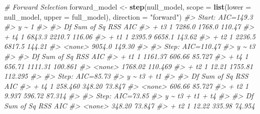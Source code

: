 \documentclass[
]{article}
\newenvironment{Shaded}{\begin{snugshade}}{\end{snugshade}}
\newcommand{\AttributeTok}[1]{\textcolor[rgb]{0.13,0.29,0.53}{#1}}
\newcommand{\CommentTok}[1]{\textcolor[rgb]{0.56,0.35,0.01}{\textit{#1}}}
\newcommand{\FunctionTok}[1]{\textcolor[rgb]{0.13,0.29,0.53}{\textbf{#1}}}
\newcommand{\NormalTok}[1]{#1}
\newcommand{\OtherTok}[1]{\textcolor[rgb]{0.56,0.35,0.01}{#1}}
\newcommand{\StringTok}[1]{\textcolor[rgb]{0.31,0.60,0.02}{#1}}
\begin{document}
\begin{Shaded}
\begin{Highlighting}[]
\CommentTok{\# Forward Selection}
\NormalTok{forward\_model }\OtherTok{\textless{}{-}} \FunctionTok{step}\NormalTok{(null\_model, }\AttributeTok{scope =} \FunctionTok{list}\NormalTok{(}\AttributeTok{lower =}\NormalTok{ null\_model, }\AttributeTok{upper =}\NormalTok{ full\_model), }\AttributeTok{direction =} \StringTok{"forward"}\NormalTok{)}
\CommentTok{\#\textgreater{} Start:  AIC=149.3}
\CommentTok{\#\textgreater{} y \textasciitilde{} 1}
\CommentTok{\#\textgreater{} }
\CommentTok{\#\textgreater{}        Df Sum of Sq    RSS    AIC}
\CommentTok{\#\textgreater{} + t3    1    7286.0 1768.0 110.47}
\CommentTok{\#\textgreater{} + t4    1    6843.3 2210.7 116.06}
\CommentTok{\#\textgreater{} + t1    1    2395.9 6658.1 143.62}
\CommentTok{\#\textgreater{} + t2    1    2236.5 6817.5 144.21}
\CommentTok{\#\textgreater{} \textless{}none\textgreater{}              9054.0 149.30}
\CommentTok{\#\textgreater{} }
\CommentTok{\#\textgreater{} Step:  AIC=110.47}
\CommentTok{\#\textgreater{} y \textasciitilde{} t3}
\CommentTok{\#\textgreater{} }
\CommentTok{\#\textgreater{}        Df Sum of Sq     RSS     AIC}
\CommentTok{\#\textgreater{} + t1    1   1161.37  606.66  85.727}
\CommentTok{\#\textgreater{} + t4    1    656.71 1111.31 100.861}
\CommentTok{\#\textgreater{} \textless{}none\textgreater{}              1768.02 110.469}
\CommentTok{\#\textgreater{} + t2    1     12.21 1755.81 112.295}
\CommentTok{\#\textgreater{} }
\CommentTok{\#\textgreater{} Step:  AIC=85.73}
\CommentTok{\#\textgreater{} y \textasciitilde{} t3 + t1}
\CommentTok{\#\textgreater{} }
\CommentTok{\#\textgreater{}        Df Sum of Sq    RSS    AIC}
\CommentTok{\#\textgreater{} + t4    1   258.460 348.20 73.847}
\CommentTok{\#\textgreater{} \textless{}none\textgreater{}              606.66 85.727}
\CommentTok{\#\textgreater{} + t2    1     9.937 596.72 87.314}
\CommentTok{\#\textgreater{} }
\CommentTok{\#\textgreater{} Step:  AIC=73.85}
\CommentTok{\#\textgreater{} y \textasciitilde{} t3 + t1 + t4}
\CommentTok{\#\textgreater{} }
\CommentTok{\#\textgreater{}        Df Sum of Sq    RSS    AIC}
\CommentTok{\#\textgreater{} \textless{}none\textgreater{}              348.20 73.847}
\CommentTok{\#\textgreater{} + t2    1     12.22 335.98 74.954}


\end{Highlighting}
\end{Shaded}
\end{document}
